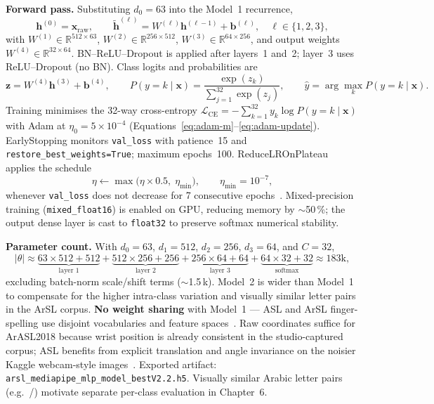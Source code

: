 \noindent\textbf{Forward pass.} Substituting $d_0{=}63$ into the Model~1 recurrence,
\begin{equation}
\mathbf{h}^{(0)} = \mathbf{x}_{\text{raw}}, \qquad
\tilde{\mathbf{h}}^{(\ell)} = W^{(\ell)} \mathbf{h}^{(\ell-1)} + \mathbf{b}^{(\ell)}, \quad \ell \in \{1,2,3\},
\end{equation}
with $W^{(1)} \in \mathbb{R}^{512 \times 63}$, $W^{(2)} \in \mathbb{R}^{256 \times 512}$, $W^{(3)} \in \mathbb{R}^{64 \times 256}$, and output weights $W^{(4)} \in \mathbb{R}^{32 \times 64}$. BN--ReLU--Dropout is applied after layers~1 and~2; layer~3 uses ReLU--Dropout (no BN). Class logits and probabilities are
\begin{equation}
\mathbf{z} = W^{(4)} \mathbf{h}^{(3)} + \mathbf{b}^{(4)}, \qquad
P(y{=}k \mid \mathbf{x}) = \frac{\exp(z_k)}{\sum_{j=1}^{32} \exp(z_j)}, \qquad \hat{y} = \arg\max_k P(y{=}k \mid \mathbf{x}).
\end{equation}
Training minimises the 32-way cross-entropy $\mathcal{L}_{\text{CE}} = -\sum_{k=1}^{32} y_k \log P(y{=}k \mid \mathbf{x})$ with Adam at $\eta_0{=}5\times10^{-4}$ (Equations~\eqref{eq:adam-m}--\eqref{eq:adam-update}). EarlyStopping monitors \texttt{val\_loss} with patience~15 and \texttt{restore\_best\_weights=True}; maximum epochs~100. ReduceLROnPlateau applies the schedule
\begin{equation}
\label{eq:rlrop}
\eta \leftarrow \max\!\bigl(\eta \times 0.5,\; \eta_{\min}\bigr), \qquad \eta_{\min} = 10^{-7},
\end{equation}
whenever \texttt{val\_loss} does not decrease for 7 consecutive epochs~\cite{kingma2015adam}. Mixed-precision training (\texttt{mixed\_float16}) is enabled on GPU, reducing memory by $\sim$50\,\%; the output dense layer is cast to \texttt{float32} to preserve softmax numerical stability.\par\vspace{0.3cm}

\noindent\textbf{Parameter count.} With $d_0{=}63$, $d_1{=}512$, $d_2{=}256$, $d_3{=}64$, and $C{=}32$,
\begin{equation}
|\theta| \approx \underbrace{63{\times}512 + 512}_{\text{layer 1}} + \underbrace{512{\times}256 + 256}_{\text{layer 2}} + \underbrace{256{\times}64 + 64}_{\text{layer 3}} + \underbrace{64{\times}32 + 32}_{\text{softmax}} \approx 183\text{k},
\end{equation}
excluding batch-norm scale/shift terms ($\sim$1.5\,k). Model~2 is wider than Model~1 to compensate for the higher intra-class variation and visually similar letter pairs in the ArSL corpus. \textbf{No weight sharing} with Model~1 --- ASL and ArSL finger-spelling use disjoint vocabularies and feature spaces~\cite{arthur2018arasl2018}. Raw coordinates suffice for ArASL2018 because wrist position is already consistent in the studio-captured corpus; ASL benefits from explicit translation and angle invariance on the noisier Kaggle webcam-style images~\cite{akash2019aslalphabet}. Exported artifact: \texttt{arsl\_mediapipe\_mlp\_model\_bestV2.2.h5}. Visually similar Arabic letter pairs (e.g.\ /) motivate separate per-class evaluation in Chapter~6.\par\vspace{0.4cm}

